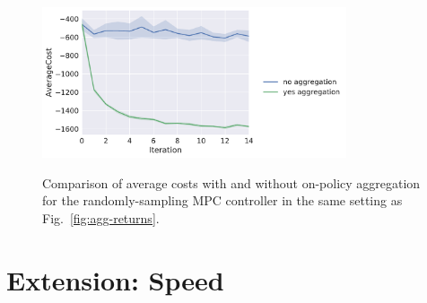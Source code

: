 \documentclass{article}
\begin{document}
\begin{figure}[!h]
  \begin{center}
    {\includegraphics[width=0.8\textwidth]{AverageCost.pdf}}  
  \end{center}
  \caption{Comparison of average costs with and without on-policy aggregation for the randomly-sampling MPC controller in the same setting as Fig.~\ref{fig:agg-returns}.}
\label{fig:agg-costs}
\end{figure}

\FloatBarrier

\section{Extension: Speed}
\end{document}
